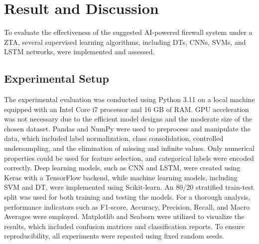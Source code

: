\documentclass[conference]{IEEEtran}
\begin{document}
\vspace{-3mm}
\section{Result and Discussion}\label{sec4}
To evaluate the effectiveness of the suggested AI-powered firewall system under a ZTA, several supervised learning algorithms, including DTs, CNNs, SVMs, and LSTM networks, were implemented and assessed. %

\subsection{Experimental Setup}
The experimental evaluation was conducted using Python 3.11 on a local machine equipped with an Intel Core i7 processor and 16 GB of RAM. GPU acceleration was not necessary due to the efficient model designs and the moderate size of the chosen dataset.
Pandas and NumPy were used to preprocess and manipulate the data, which included label normalization, class consolidation, controlled undersampling, and the elimination of missing and infinite values. Only numerical properties could be used for feature selection, and categorical labels were encoded correctly.
Deep learning models, such as CNN and LSTM, were created using Keras with a TensorFlow backend, while machine learning models, including SVM and DT, were implemented using Scikit-learn. An 80/20 stratified train-test split was used for both training and testing the models.
For a thorough analysis, performance indicators such as F1-score, Accuracy, Precision, Recall, and Macro Averages were employed. Matplotlib and Seaborn were utilized to visualize the results, which included confusion matrices and classification reports. To ensure reproducibility, all experiments were repeated using fixed random seeds.

\end{document}
